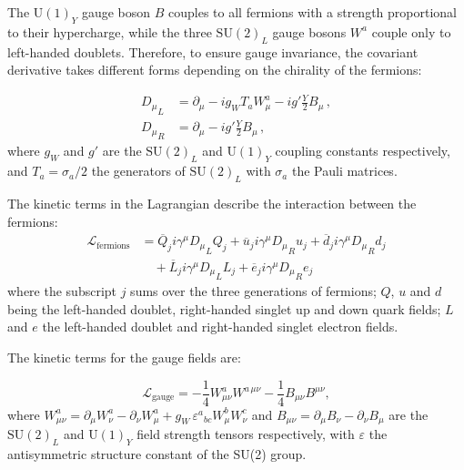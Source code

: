 The $\mathrm{U}(1)_Y$ gauge boson $B$ couples to all fermions with a strength proportional to their hypercharge, while the three $\mathrm{SU}(2)_L$ gauge bosons $W^a$ couple only to left-handed doublets. Therefore, to ensure gauge invariance, the covariant derivative takes different forms depending on the chirality of the fermions:

\begin{align}
    {D_\mu}_L &= \partial_\mu - i g_W T_a W^a_\mu - i g' \frac{Y}{2} B_\mu \,, \\
    \label{eq:covariantDerivativeWeak}
    {D_\mu}_R &= \partial_\mu - i g' \frac{Y}{2} B_\mu \,,
\end{align}
where $g_W$ and $g'$ are the $\mathrm{SU}(2)_L$ and $\mathrm{U}(1)_Y$ coupling constants respectively, and $T_a = \sigma_a/2$ the generators of $\mathrm{SU}(2)_L$ with $\sigma_a$ the Pauli matrices. 

The kinetic terms in the Lagrangian describe the interaction between the fermions:
\begin{equation}
    \begin{split}
        \mathcal{L}_\mathrm{fermions} &= 
        \overline{Q}_j i \gamma^\mu {D_\mu}_L Q_j + \overline{u}_j i \gamma^\mu {D_\mu}_R u_j + \overline{d}_j i \gamma^\mu {D_\mu}_R d_j \\
        & \quad + \overline{L}_j i \gamma^\mu {D_\mu}_L L_j + \overline{e}_j i \gamma^\mu {D_\mu}_R e_j
    \end{split}
\end{equation}
where the subscript $j$ sums over the three generations of fermions; $Q$, $u$ and $d$ being the left-handed doublet, right-handed singlet up and down quark fields; $L$ and $e$ the left-handed doublet and right-handed singlet electron fields.

The kinetic terms for the gauge fields are:

\begin{equation}
    \mathcal{L}_{\text{gauge}} = -\frac{1}{4} W^a_{\mu\nu} W^{a\,\mu\nu}
    - \frac{1}{4} B_{\mu\nu} B^{\mu\nu},
\end{equation}
where $W^a_{\mu\nu} = \partial_\mu W^a_\nu - \partial_\nu W^a_\mu + g_W\, \varepsilon^{a}{}_{bc} W^b_\mu W^c_\nu$ and $B_{\mu\nu} = \partial_\mu B_\nu - \partial_\nu B_\mu$ are the $\mathrm{SU}(2)_L$ and $\mathrm{U}(1)_Y$ field strength tensors respectively, with $\varepsilon$ the antisymmetric structure constant of the SU(2) group.

\vspace{0.5 cm}

